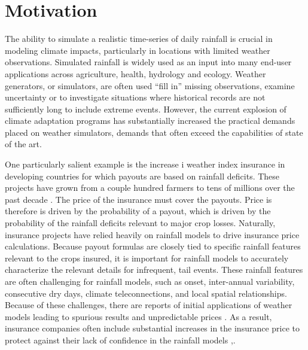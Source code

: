 \documentclass[12pt]{article}
\begin{document}
\newpage




\section{Motivation}

The ability to simulate a realistic time-series of daily rainfall is crucial in modeling climate impacts, particularly in locations with limited weather observations.   Simulated rainfall is widely used as an input into many end-user applications across agriculture, health, hydrology and ecology.  Weather generators, or simulators, are often used ``fill in'' missing observations, examine uncertainty or to investigate situations where historical records are not sufficiently long to include extreme events.   However, the current explosion of climate adaptation programs has substantially increased the practical demands placed on weather simulators, demands that often exceed the capabilities of state of the art.  

One particularly salient example is the increase i weather index insurance in developing countries for which payouts are based on rainfall deficits.  These projects have grown from a couple hundred farmers to tens of millions over the past decade \citep{Greatrex2015}.   The price of the insurance must cover the payouts.  Price is therefore is driven by the probability of a payout, which is driven by the probability of the rainfall deficits relevant to major crop losses. Naturally, insurance projects have relied heavily on rainfall models to drive insurance price calculations.  Because payout formulas are closely tied to specific rainfall features relevant to the crops insured, it is important for rainfall models to accurately characterize the relevant details for infrequent, tail events.  These rainfall features are often challenging for rainfall models, such as onset, inter-annual variability, consecutive dry days, climate teleconnections, and local spatial relationships. Because of these challenges, there are reports of initial applications of weather models leading to spurious results and unpredictable prices \citep{Giannini2009}.  As a result, insurance companies often include substantial increases in the insurance price to protect against their lack of confidence in the rainfall models \citep{Osgood2012},.
\end{document}
